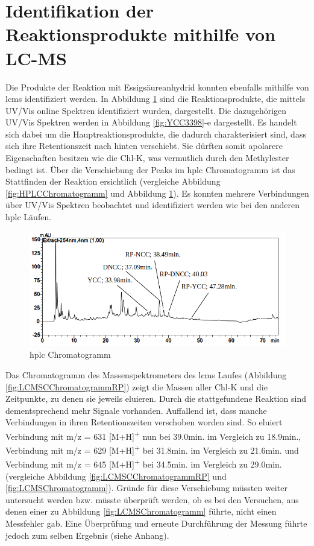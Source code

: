 \section{Identifikation der Reaktionsprodukte mithilfe von LC-MS}

Die Produkte der Reaktion mit Essigsäureanhydrid konnten ebenfalls mithilfe von \gls{lcms} identifiziert werden. In Abbildung \ref{fig:HPLCChromatogrammRP} sind die Reaktionsprodukte, die mittels UV/Vis online Spektren identifiziert wurden, dargestellt. Die dazugehörigen UV/Vis Spektren werden in Abbildung \ref{fig:YCC3398}-e dargestellt. Es handelt sich dabei um die Hauptreaktionsprodukte, die dadurch charakterisiert sind, dass sich ihre Retentionszeit nach hinten verschiebt. Sie dürften somit apolarere Eigenschaften besitzen wie die \gls{Chl-K}, was vermutlich durch den Methylester bedingt ist. Über die Verschiebung der Peaks im \gls{hplc} Chromatogramm ist das Stattfinden der Reaktion ersichtlich (vergleiche Abbildung \ref{fig:HPLCChromatogramm} und Abbildung \ref{fig:HPLCChromatogrammRP}). Es konnten mehrere Verbindungen über UV/Vis Spektren beobachtet und identifiziert werden wie bei den anderen \gls{hplc} Läufen.

\begin{figure}[!htbp]
  \includegraphics[width=\textwidth]{figures/Kapitel6/Reaktion3h/HPLC_Chromatogramm.png}
  \caption[HPLC Chromatogramm nach 3h Reaktionsdauer, Quelle: Author]{\gls{hplc} Chromatogramm}
  \label{fig:HPLCChromatogrammRP}
\end{figure}

Das Chromatogramm des Massenspektrometers des \gls{lcms} Laufes (Abbildung \ref{fig:LCMSCChromatogrammRP}) zeigt die Massen aller \gls{Chl-K} und die Zeitpunkte, zu denen sie jeweils eluieren. Durch die stattgefundene Reaktion sind dementsprechend mehr Signale vorhanden. Auffallend ist, dass manche Verbindungen in ihren Retentionszeiten verschoben worden sind. So eluiert Verbindung mit m/z = 631 [M+H]\textsuperscript{+} nun bei 39.0min. im Vergleich zu 18.9min., Verbindung mit m/z = 629 [M+H]\textsuperscript{+} bei 31.8min. im Vergleich zu 21.6min. und Verbindung mit m/z = 645 [M+H]\textsuperscript{+} bei 34.5min. im Vergleich zu 29.0min. (vergleiche Abbildung \ref{fig:LCMSCChromatogrammRP} und \ref{fig:LCMSChromatogramm}). Gründe für diese Verschiebung müssten weiter untersucht werden bzw. müsste überprüft werden, ob es bei den Versuchen, aus denen einer zu Abbildung \ref{fig:LCMSChromatogramm} führte, nicht einen Messfehler gab. Eine Überprüfung und erneute Durchführung der Messung führte jedoch zum selben Ergebnis (siehe Anhang).

